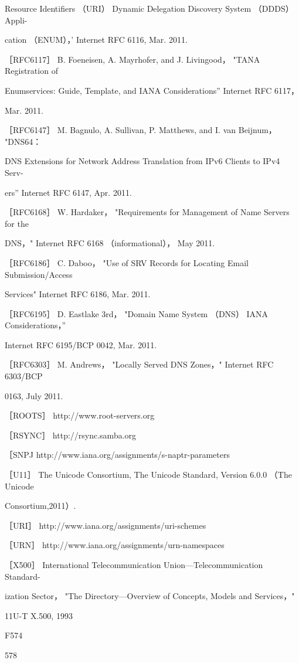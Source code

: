 Resource Identifiers （URI） Dynamic Delegation Discovery System （DDDS） Appli-

cation （ENUM），' Internet RFC 6116, Mar. 2011.

［RFC6117］ B. Foeneisen, A. Mayrhofer, and J. Livingood， "TANA Registration of

Enumservices: Guide, Template, and IANA Considerations” Internet RFC 6117，

Mar. 2011.

［RFC6147］ M. Bagnulo, A. Sullivan, P. Matthews, and I. van Beijnum， "DNS64：

DNS Extensions for Network Address Translation from IPv6 Clients to IPv4 Serv-

ers” Internet RFC 6147, Apr. 2011.

［RFC6168］ W. Hardaker， "Requirements for Management of Name Servers for the

DNS，" Internet RFC 6168 （informational）， May 2011.

［RFC6186］ C. Daboo， "Use of SRV Records for Locating Email Submission/Access

Services" Internet RFC 6186, Mar. 2011.

［RFC6195］ D. Eastlake 3rd， "Domain Name System （DNS） IANA Considerations，”

Internet RFC 6195/BCP 0042, Mar. 2011.

［RFC6303］ M. Andrews， "Locally Served DNS Zones，" Internet RFC 6303/BCP

0163, July 2011.

［ROOTS］ http://www.root-servers.org

［RSYNC］ http://rsync.samba.org

［SNPJ http://www.iana.org/assignments/s-naptr-parameters

［U11］ The Unicode Consortium, The Unicode Standard, Version 6.0.0 （The Unicode

Consortium,2011）.

［URI］ http://www.iana.org/assignments/uri-schemes

［URN］ http://www.iana.org/assignments/urn-namespaces

［X500］ International Telecommunication Union—Telecommunication Standard-

ization Sector， "The Directory—Overview of Concepts, Models and Services，"

11U-T X.500, 1993

F574

578